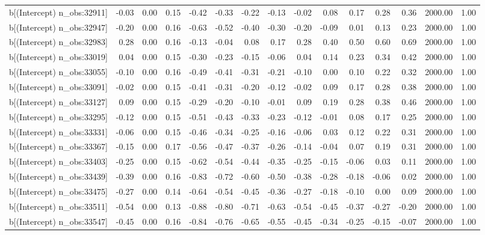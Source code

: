 \begin{table}[ht]
\begin{tabular}{rrrrrrrrrrrrrrr}
  b[(Intercept) n\_obs:32911] & -0.03 & 0.00 & 0.15 & -0.42 & -0.33 & -0.22 & -0.13 & -0.02 & 0.08 & 0.17 & 0.28 & 0.36 & 2000.00 & 1.00 \\ 
  b[(Intercept) n\_obs:32947] & -0.20 & 0.00 & 0.16 & -0.63 & -0.52 & -0.40 & -0.30 & -0.20 & -0.09 & 0.01 & 0.13 & 0.23 & 2000.00 & 1.00 \\ 
  b[(Intercept) n\_obs:32983] & 0.28 & 0.00 & 0.16 & -0.13 & -0.04 & 0.08 & 0.17 & 0.28 & 0.40 & 0.50 & 0.60 & 0.69 & 2000.00 & 1.00 \\ 
  b[(Intercept) n\_obs:33019] & 0.04 & 0.00 & 0.15 & -0.30 & -0.23 & -0.15 & -0.06 & 0.04 & 0.14 & 0.23 & 0.34 & 0.42 & 2000.00 & 1.00 \\ 
  b[(Intercept) n\_obs:33055] & -0.10 & 0.00 & 0.16 & -0.49 & -0.41 & -0.31 & -0.21 & -0.10 & 0.00 & 0.10 & 0.22 & 0.32 & 2000.00 & 1.00 \\ 
  b[(Intercept) n\_obs:33091] & -0.02 & 0.00 & 0.15 & -0.41 & -0.31 & -0.20 & -0.12 & -0.02 & 0.09 & 0.17 & 0.28 & 0.38 & 2000.00 & 1.00 \\ 
  b[(Intercept) n\_obs:33127] & 0.09 & 0.00 & 0.15 & -0.29 & -0.20 & -0.10 & -0.01 & 0.09 & 0.19 & 0.28 & 0.38 & 0.46 & 2000.00 & 1.00 \\ 
  b[(Intercept) n\_obs:33295] & -0.12 & 0.00 & 0.15 & -0.51 & -0.43 & -0.33 & -0.23 & -0.12 & -0.01 & 0.08 & 0.17 & 0.25 & 2000.00 & 1.00 \\ 
  b[(Intercept) n\_obs:33331] & -0.06 & 0.00 & 0.15 & -0.46 & -0.34 & -0.25 & -0.16 & -0.06 & 0.03 & 0.12 & 0.22 & 0.31 & 2000.00 & 1.00 \\ 
  b[(Intercept) n\_obs:33367] & -0.15 & 0.00 & 0.17 & -0.56 & -0.47 & -0.37 & -0.26 & -0.14 & -0.04 & 0.07 & 0.19 & 0.31 & 2000.00 & 1.00 \\ 
  b[(Intercept) n\_obs:33403] & -0.25 & 0.00 & 0.15 & -0.62 & -0.54 & -0.44 & -0.35 & -0.25 & -0.15 & -0.06 & 0.03 & 0.11 & 2000.00 & 1.00 \\ 
  b[(Intercept) n\_obs:33439] & -0.39 & 0.00 & 0.16 & -0.83 & -0.72 & -0.60 & -0.50 & -0.38 & -0.28 & -0.18 & -0.06 & 0.02 & 2000.00 & 1.00 \\ 
  b[(Intercept) n\_obs:33475] & -0.27 & 0.00 & 0.14 & -0.64 & -0.54 & -0.45 & -0.36 & -0.27 & -0.18 & -0.10 & 0.00 & 0.09 & 2000.00 & 1.00 \\ 
  b[(Intercept) n\_obs:33511] & -0.54 & 0.00 & 0.13 & -0.88 & -0.80 & -0.71 & -0.63 & -0.54 & -0.45 & -0.37 & -0.27 & -0.20 & 2000.00 & 1.00 \\ 
  b[(Intercept) n\_obs:33547] & -0.45 & 0.00 & 0.16 & -0.84 & -0.76 & -0.65 & -0.55 & -0.45 & -0.34 & -0.25 & -0.15 & -0.07 & 2000.00 & 1.00 \\ 

\end{tabular}
\end{table}
